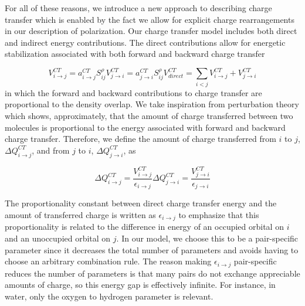 \documentclass[journal=jctcce,manuscript=article]{achemso}
\begin{document}
For all of these reasons, we introduce a new approach to describing charge transfer
which is enabled by the fact we allow for explicit charge rearrangements in our
description of polarization. Our charge transfer model includes both direct and
indirect energy contributions. The direct contributions allow for energetic stabilization
associated with both forward and backward charge transfer

\begin{subequations}
  \begin{equation}
  V^{CT}_{i\rightarrow j}=a_{i\rightarrow j}^{CT}S_{ij}^\rho
\end{equation}
\begin{equation}
  V^{CT}_{j\rightarrow i}=a_{j\rightarrow i}^{CT}S_{ij}^\rho
\end{equation}
\begin{equation}
  V^{CT}_{direct}=\sum_{i<j}V^{CT}_{i\rightarrow j}+V^{CT}_{j\rightarrow i}
\end{equation}
  \label{eq:ct_direct}
\end{subequations}
in which the forward and backward contributions to
charge transfer are proportional to the density overlap. We take inspiration from perturbation theory which shows, approximately, that
the amount of charge transferred between two molecules is proportional to the
energy associated with forward and backward charge transfer.\cite{khaliullin2007,khaliullin2008analysis,khaliullin2009electron}
Therefore, we define the amount of charge transferred from $i$ to $j$, $\Delta Q^{CT}_{i\rightarrow j}$,
and from $j$ to $i$, $\Delta Q^{CT}_{j\rightarrow i}$, as

\begin{subequations}
  \begin{equation}
  \Delta Q^{CT}_{i\rightarrow j}=\frac{V^{CT}_{i\rightarrow j}}{\epsilon_{i\rightarrow j}}
    \label{eq:ct_forward}
\end{equation}
\begin{equation}
  \Delta Q^{CT}_{j\rightarrow i}=\frac{V^{CT}_{j\rightarrow i}}{\epsilon_{j\rightarrow i}}
\end{equation}
\end{subequations}

The proportionality constant between direct charge transfer energy and the amount of transferred charge is written as $\epsilon_{i\rightarrow j}$ to emphasize that this proportionality is related to the difference in energy of an occupied orbital on $i$ and an unoccupied orbital on $j$.\cite{khaliullin2007} In our model, we choose this to be a pair-specific parameter since it decreases the total number of parameters and avoids having to choose an arbitrary combination rule. The reason making $\epsilon_{i\rightarrow j}$ pair-specific reduces the number of parameters is that many pairs do not exchange appreciable amounts of charge, so this energy gap is effectively infinite. For instance, in water, only the oxygen to hydrogen parameter is relevant.
\end{document}
